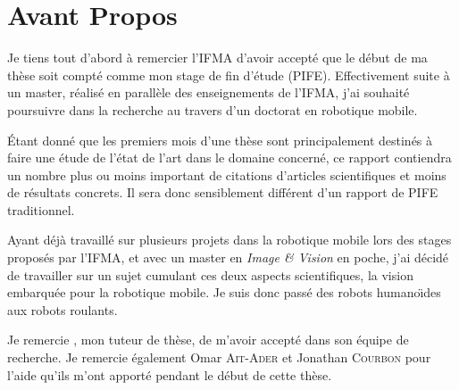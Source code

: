 \section*{Avant Propos}

Je tiens tout d'abord à remercier l'IFMA d'avoir accepté que le début de ma thèse soit compté comme mon stage de fin d'étude (PIFE).
Effectivement suite à un master, réalisé en parallèle des enseignements de l'IFMA, j'ai souhaité poursuivre dans la recherche au travers d'un doctorat en robotique mobile.

\'Etant donné que les premiers mois d'une thèse sont principalement destinés à faire une étude de l'état de l'art dans le domaine concerné, ce rapport contiendra un nombre plus ou moins important de citations d'articles scientifiques et moins de résultats concrets. Il sera donc sensiblement différent d'un rapport de PIFE traditionnel.

Ayant déjà travaillé sur plusieurs projets dans la robotique mobile lors des stages proposés par l'IFMA, et avec un master en \emph{Image \& Vision} en poche, j'ai décidé de travailler sur un sujet cumulant ces deux aspects scientifiques, la vision embarquée pour la robotique mobile. Je suis donc passé des robots humano\"{\i}des aux robots roulants.

Je remercie \tuteur, mon tuteur de thèse, de m'avoir accepté dans son équipe de recherche. Je remercie également Omar \textsc{Ait-Ader} et Jonathan \textsc{Courbon} pour l'aide qu'ils m'ont apporté pendant le début de cette thèse.